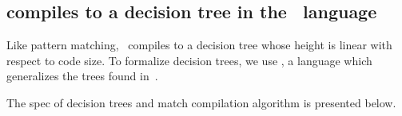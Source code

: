 \documentclass[article,screen,12pt, nonacm]{acmart}
\begin{document}
        
    






\subsection{\VMinus compiles to a decision tree in the ~\D language}
\label{d}

Like pattern matching, \VMinus~compiles to a decision tree whose height is 
linear with respect to code size. To formalize decision trees, we use 
\D, a language which generalizes the trees found in~\citet{maranget}. 

The spec of decision trees and match compilation algorithm is presented below. 
\end{document}
